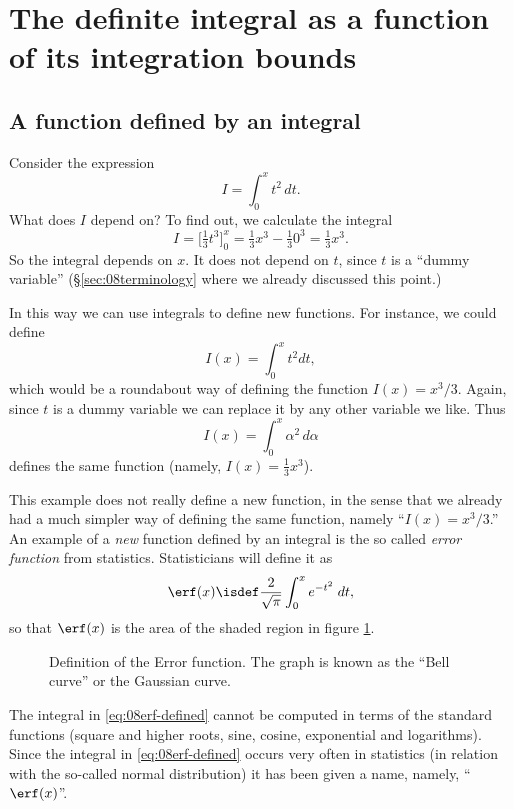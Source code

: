 \section{The definite integral as a function of its integration bounds}
\subsection{A function defined by an integral}
Consider the expression
\[
I = \int_0^x t^2\, dt.
\]
What does $I$ depend on?  To find out, we calculate the integral
\[
I = \bigl[\tfrac13t^3\bigr]_0^x 
= \tfrac13 x^3 - \tfrac13 0^3
= \tfrac13 x^3.
\]
So the integral depends on $x$.  It does not depend on $t$, since $t$
is a ``dummy variable'' (\S\ref{sec:08terminology} where we already
discussed this point.)

In this way we can use integrals to define new functions.  For
instance, we could define
\[
I(x) = \int_0^x t^2 dt,
\]
which would be a roundabout way of defining the function $I(x) = x^3/3$.  Again,
since $t$ is a dummy variable we can replace it by any other variable we like.
Thus
\[
I(x) = \int_0^x \alpha^2\, d\alpha
\]
defines the same function (namely, $I(x) = \frac13x^3$).

This example does not really define a new function, in the sense that
we already had a much simpler way of defining the same function,
namely ``$I(x) = x^3/3$.''  An example of a \textit{new} function
defined by an integral is the so called \emph{error function} from
statistics.  Statisticians will define it as
\begin{equation}\label{eq:08erf-defined}
  \erf(x) \isdef
  \frac2{\sqrt\pi} \int _0 ^x e^{-t^2}\;dt,
\end{equation}
so that $\erf(x)$ is the area of the shaded region in figure \ref{fig:08erf}.
\begin{figure}[h]
  \centerline{}
  \caption{Definition of the Error function.  The graph is known as
    the ``Bell curve'' or the Gaussian curve.}
  \label{fig:08erf}
\end{figure}
The integral in \eqref{eq:08erf-defined} cannot be computed in terms of the
standard functions (square and higher roots, sine, cosine, exponential and
logarithms).  Since  the integral in \eqref{eq:08erf-defined} occurs very often
in statistics (in relation with the so-called normal distribution) it has been
given a name, namely, ``$\erf(x)$''.

